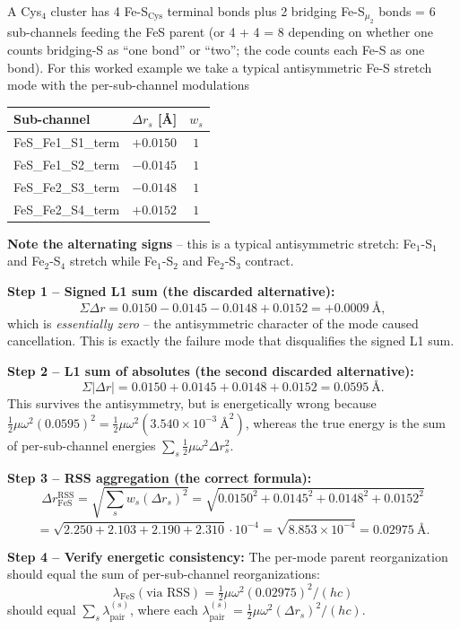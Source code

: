 \documentclass[10pt,a4paper,twoside]{article}
\begin{document}
\begin{workedexample}
A Cys$_4$ cluster has 4 Fe-S$_\text{Cys}$ terminal bonds plus 2 bridging
Fe-S$_{\mu_2}$ bonds = 6 sub-channels feeding the FeS parent (or
4 + 4 = 8 depending on whether one counts bridging-S as ``one bond''
or ``two''; the code counts each Fe-S as one bond). For this
worked example we take a typical antisymmetric Fe-S stretch mode
with the per-sub-channel modulations
\begin{center}
\begin{tabular}{lcc}
\toprule
Sub-channel       & $\Delta r_s$ [\AA{}] & $w_s$ \\
\midrule
FeS\_Fe1\_S1\_term  & $+0.0150$ & $1$ \\
FeS\_Fe1\_S2\_term  & $-0.0145$ & $1$ \\
FeS\_Fe2\_S3\_term  & $-0.0148$ & $1$ \\
FeS\_Fe2\_S4\_term  & $+0.0152$ & $1$ \\
\bottomrule
\end{tabular}
\end{center}

\textbf{Note the alternating signs} -- this is a typical
antisymmetric stretch: Fe$_1$-S$_1$ and Fe$_2$-S$_4$ stretch
while Fe$_1$-S$_2$ and Fe$_2$-S$_3$ contract.

\textbf{Step 1 -- Signed L1 sum (the discarded alternative):}
\[
  \Sigma \Delta r = 0.0150 - 0.0145 - 0.0148 + 0.0152
   = +0.0009~\text{\AA{}},
\]
which is \emph{essentially zero} -- the antisymmetric character
of the mode caused cancellation. This is exactly the failure
mode that disqualifies the signed L1 sum.

\textbf{Step 2 -- L1 sum of absolutes (the second discarded alternative):}
\[
  \Sigma |\Delta r| = 0.0150 + 0.0145 + 0.0148 + 0.0152
   = 0.0595~\text{\AA{}}.
\]
This survives the antisymmetry, but is energetically wrong because
$\tfrac{1}{2}\mu\omega^2 (0.0595)^2 = \tfrac{1}{2}\mu\omega^2 (3.540
\times 10^{-3}~\text{\AA}^2)$, whereas the true energy is the sum
of per-sub-channel energies $\sum_s \tfrac{1}{2}\mu\omega^2 \Delta
r_s^2$.

\textbf{Step 3 -- RSS aggregation (the correct formula):}
\[
  \Delta r_\text{FeS}^\text{RSS}
   = \sqrt{\sum_s w_s (\Delta r_s)^2}
   = \sqrt{0.0150^2 + 0.0145^2 + 0.0148^2 + 0.0152^2}
\]
\[
   = \sqrt{2.250 + 2.103 + 2.190 + 2.310} \cdot 10^{-4}
   = \sqrt{8.853 \times 10^{-4}}
   = \boxed{0.02975~\text{\AA{}}}.
\]

\textbf{Step 4 -- Verify energetic consistency:}
The per-mode parent reorganization should equal the sum of
per-sub-channel reorganizations:
\[
  \lambda_\text{FeS}(\text{via RSS})
   = \tfrac{1}{2}\mu\omega^2 (0.02975)^2 / (hc)
\]
should equal $\sum_s \lambda_\text{pair}^{(s)}$, where each
$\lambda_\text{pair}^{(s)} = \tfrac{1}{2}\mu\omega^2 (\Delta r_s)^2/(hc)$.


\end{workedexample}
\end{document}
